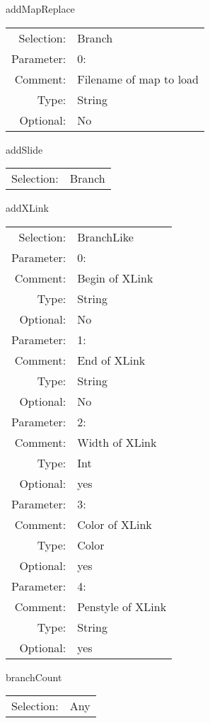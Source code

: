 \item addMapReplace\\
\begin{tabular}{rl}
  Selection: & Branch\\
   Parameter: &  0:\\
        Comment: & Filename of map to load\\
           Type: & String\\
       Optional: &  No\\
\end{tabular}

\item addSlide\\
\begin{tabular}{rl}
  Selection: & Branch\\
\end{tabular}

\item addXLink\\
\begin{tabular}{rl}
  Selection: & BranchLike\\
   Parameter: &  0:\\
        Comment: & Begin of XLink\\
           Type: & String\\
       Optional: &  No\\
   Parameter: &  1:\\
        Comment: & End of XLink\\
           Type: & String\\
       Optional: &  No\\
   Parameter: &  2:\\
        Comment: & Width of XLink\\
           Type: & Int\\
       Optional: &  yes\\
   Parameter: &  3:\\
        Comment: & Color of XLink\\
           Type: & Color\\
       Optional: &  yes\\
   Parameter: &  4:\\
        Comment: & Penstyle of XLink\\
           Type: & String\\
       Optional: &  yes\\
\end{tabular}

\item branchCount\\
\begin{tabular}{rl}
  Selection: & Any\\
\end{tabular}

